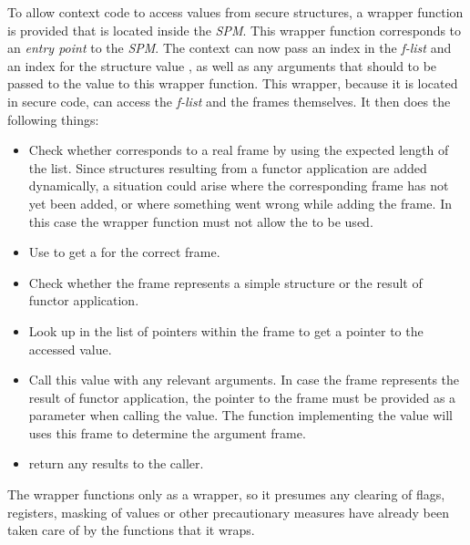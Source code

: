 To allow context code to access values from secure structures, a wrapper function is provided that is located inside the \emph{SPM}.
This wrapper function corresponds to an \emph{entry point} to the \emph{SPM}.
The context can now pass an index in the \emph{f-list}  and an index for the structure value , as well as any arguments that should to be passed to the value to this wrapper function.
This wrapper, because it is located in secure code, can access the \emph{f-list} and the frames themselves.
It then does the following things:
\begin{itemize}
\item Check whether  corresponds to a real frame by using the expected length of the list.
Since structures resulting from a functor application are added dynamically, a situation could arise where the corresponding frame has not yet been added, or where something went wrong while adding the frame.
In this case the wrapper function must not allow the  to be used.
\item Use  to get a  for the correct frame.
\item Check whether the frame represents a simple structure or the result of functor application.
\item Look up  in the list of pointers within the frame to get a pointer to the accessed value.
\item Call this value with any relevant arguments.
In case the frame represents the result of functor application, the pointer to the frame must be provided as a parameter when calling the value.
The function implementing the value will uses this frame to determine the argument frame.
\item return any results to the caller.
\end{itemize}

The wrapper functions only as a wrapper, so it presumes any clearing of flags, registers, masking of values or other precautionary measures have already been taken care of by the functions that it wraps.

